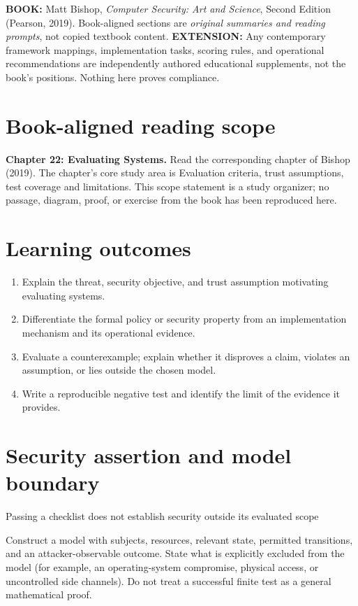 \documentclass[10pt,letterpaper]{article}
\begin{document}
\makedoctocpage
\begin{notebox}
\textbf{BOOK:} Matt Bishop, \emph{Computer Security: Art and Science}, Second Edition (Pearson, 2019). Book-aligned sections are \emph{original summaries and reading prompts}, not copied textbook content.
\textbf{EXTENSION:} Any contemporary framework mappings, implementation tasks, scoring rules, and operational recommendations are independently authored educational supplements, not the book's positions. Nothing here proves compliance.
\end{notebox}
\section{Book-aligned reading scope}
\textbf{Chapter 22: Evaluating Systems.} Read the corresponding chapter of Bishop (2019). The chapter's core study area is Evaluation criteria, trust assumptions, test coverage and limitations. This scope statement is a study organizer; no passage, diagram, proof, or exercise from the book has been reproduced here.
\section{Learning outcomes}
\begin{enumerate}
\item Explain the threat, security objective, and trust assumption motivating evaluating systems.
\item Differentiate the formal policy or security property from an implementation mechanism and its operational evidence.
\item Evaluate a counterexample; explain whether it disproves a claim, violates an assumption, or lies outside the chosen model.
\item Write a reproducible negative test and identify the limit of the evidence it provides.
\end{enumerate}
\section{Security assertion and model boundary}
\begin{infobox}
Passing a checklist does not establish security outside its evaluated scope
\end{infobox}
Construct a model with subjects, resources, relevant state, permitted transitions, and an attacker-observable outcome. State what is explicitly excluded from the model (for example, an operating-system compromise, physical access, or uncontrolled side channels). Do not treat a successful finite test as a general mathematical proof.
\end{document}
